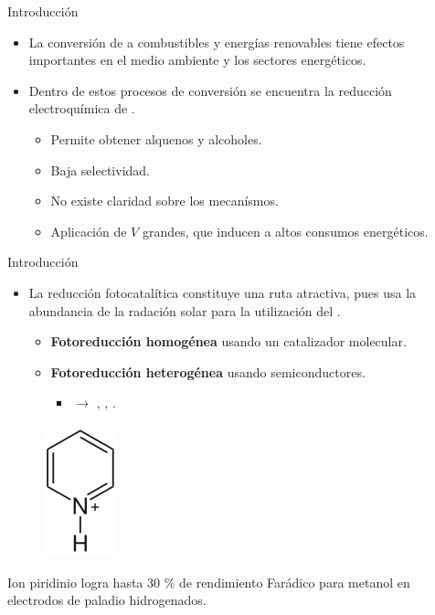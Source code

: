 \documentclass[handout]{beamer}
\begin{document}
\begin{frame}{Introducci\'on}
	\begin{itemize}
		\item La conversi\'on de  a combustibles y energ\'ias renovables tiene efectos importantes en el medio ambiente y los sectores energ\'eticos.
		\item Dentro de estos procesos de conversi\'on se  encuentra la reducci\'on electroqu\'imica de .
		\begin{itemize}
			\item Permite obtener alquenos y alcoholes.
			\item Baja selectividad.
			\item No existe claridad sobre los mecan\'ismos.
			\item Aplicaci\'on de $V$ grandes, que inducen a altos consumos energ\'eticos.
		\end{itemize}
	\end{itemize}
\end{frame}

\begin{frame}{Introducci\'on}
	\begin{itemize}
		\item La reducci\'on fotocatal\'itica constituye una ruta atractiva, pues usa la abundancia de la radaci\'on solar para la utilizaci\'on del .
		\begin{itemize}
			\item \textbf{Fotoreducci\'on homog\'enea} usando un catalizador molecular.
			\item \textbf{Fotoreducci\'on heterog\'enea} usando semiconductores.
			\begin{itemize}
				\item {}  $\longrightarrow$ , , .
			\end{itemize} 
		\end{itemize}
	\end{itemize}
	\begin{figure}[h]
		\centering
		\includegraphics[width=0.1\linewidth]{sources/pyridinium}
	\end{figure}
	Ion piridinio logra hasta 30 \% de rendimiento Far\'adico para metanol en electrodos de paladio hidrogenados.
\end{frame}
\end{document}
